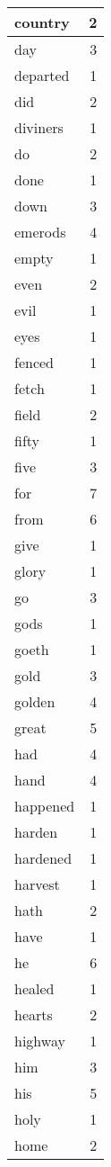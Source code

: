 \begin{center}
\begin{longtable}{l|r}
country & 2 \\ \hline
day & 3 \\ \hline
departed & 1 \\ \hline
did & 2 \\ \hline
diviners & 1 \\ \hline
do & 2 \\ \hline
done & 1 \\ \hline
down & 3 \\ \hline
emerods & 4 \\ \hline
empty & 1 \\ \hline
even & 2 \\ \hline
evil & 1 \\ \hline
eyes & 1 \\ \hline
fenced & 1 \\ \hline
fetch & 1 \\ \hline
field & 2 \\ \hline
fifty & 1 \\ \hline
five & 3 \\ \hline
for & 7 \\ \hline
from & 6 \\ \hline
give & 1 \\ \hline
glory & 1 \\ \hline
go & 3 \\ \hline
gods & 1 \\ \hline
goeth & 1 \\ \hline
gold & 3 \\ \hline
golden & 4 \\ \hline
great & 5 \\ \hline
had & 4 \\ \hline
hand & 4 \\ \hline
happened & 1 \\ \hline
harden & 1 \\ \hline
hardened & 1 \\ \hline
harvest & 1 \\ \hline
hath & 2 \\ \hline
have & 1 \\ \hline
he & 6 \\ \hline
healed & 1 \\ \hline
hearts & 2 \\ \hline
highway & 1 \\ \hline
him & 3 \\ \hline
his & 5 \\ \hline
holy & 1 \\ \hline
home & 2 \\ \hline

\end{longtable}
\end{center}
